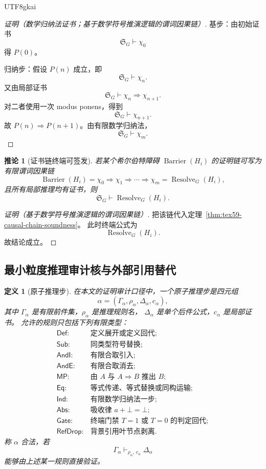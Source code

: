 \documentclass[12pt]{article}
\newtheorem{definition}{定义}[section]
\newtheorem{corollary}{推论}[section]
\DeclareMathOperator{\Resolve}{Resolve}
\DeclareMathOperator{\Barrier}{Barrier}
\begin{document}
\begin{CJK*}{UTF8}{gkai}
\begin{proof}[证明（数学归纳法证书；基于数学符号推演逻辑的谓词因果链）]
基步：由初始证书
\[
  \mathfrak S_G\vdash\chi_0
\]
得 \(P(0)\)。

归纳步：假设 \(P(n)\) 成立，即
\[
  \mathfrak S_G\vdash\chi_n.
\]
又由局部证书
\[
  \mathfrak S_G\vdash\chi_n\Rightarrow\chi_{n+1}.
\]
对二者使用一次 modus ponens，得到
\[
  \mathfrak S_G\vdash\chi_{n+1}.
\]
故 \(P(n)\Rightarrow P(n+1)\)。由有限数学归纳法，
\[
  \mathfrak S_G\vdash\chi_m.
\]
\end{proof}

\begin{corollary}[证书链终端可签发]
\label{cor:tex59-chain-terminal-issuance}
若某个希尔伯特障碍 \(\Barrier(H_i)\) 的证明链可写为有限谓词因果链
\[
  \Barrier(H_i)=\chi_0
  \Longrightarrow
  \chi_1
  \Longrightarrow
  \cdots
  \Longrightarrow
  \chi_m=\Resolve_G(H_i),
\]
且所有局部推理均有证书，则
\[
  \mathfrak S_G\vdash\Resolve_G(H_i).
\]
\end{corollary}

\begin{proof}[证明（基于数学符号推演逻辑的谓词因果链）]
把该链代入定理~\ref{thm:tex59-causal-chain-soundness}。
此时终端公式为
\[
  \Resolve_G(H_i).
\]
故结论成立。
\end{proof}

\subsection{最小粒度推理审计核与外部引用替代}
\label{subsec:tex59-atomic-audit-kernel}

\begin{definition}[原子推理步]
\label{def:tex59-atomic-inference-step}
在本文的证明审计口径中，一个原子推理步是四元组
\[
  \alpha
  =
  (\Gamma_{\alpha},\rho_{\alpha},\Delta_{\alpha},c_{\alpha}),
\]
其中 \(\Gamma_{\alpha}\) 是有限前件集，\(\rho_{\alpha}\) 是推理规则名，
\(\Delta_{\alpha}\) 是单个后件公式，\(c_{\alpha}\) 是局部证书。
允许的规则只包括下列有限类型：
\[
\begin{array}{ll}
  \mathsf{Def}: & \text{定义展开或定义回代};\\
  \mathsf{Sub}: & \text{同类型符号替换};\\
  \mathsf{AndI}: & \text{有限合取引入};\\
  \mathsf{AndE}: & \text{有限合取消去};\\
  \mathsf{MP}: & \text{由 } A \text{ 与 } A\Rightarrow B \text{ 推出 } B;\\
  \mathsf{Eq}: & \text{等式传递、等式替换或同构运输};\\
  \mathsf{Ind}: & \text{有限数学归纳法一步};\\
  \mathsf{Abs}: & \text{吸收律 } a+\bot=\bot;\\
  \mathsf{Gate}: & \text{终端门禁 }T=1\text{ 或 }T=0\text{ 的判定回代};\\
  \mathsf{RefDrop}: & \text{背景引用叶节点剥离}.
\end{array}
\]
称 \(\alpha\) 合法，若
\[
  \Gamma_{\alpha}
  \vdash_{\rho_{\alpha},\,c_{\alpha}}
  \Delta_{\alpha}
\]
能够由上述某一规则直接验证。
\end{definition}


\end{CJK*}
\end{document}

